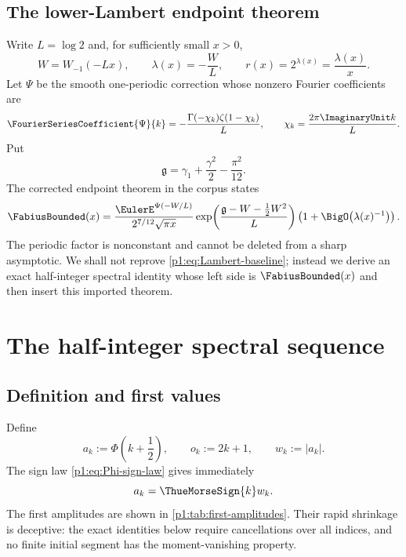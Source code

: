 \documentclass[11pt,oneside]{article}
\theoremstyle{definition}
\theoremstyle{remark}
\newcommand{\PhiU}{\Phi}
\begin{document}
\subsection{The lower-Lambert endpoint theorem}

Write $L=\log2$ and, for sufficiently small $x>0$,
\begin{equation}\label{p1:eq:lambda-W-def}
 W=W_{-1}(-Lx),
 \qquad
 \lambda(x)=-\frac WL,
 \qquad
 r(x)=2^{\lambda(x)}=\frac{\lambda(x)}x.
\end{equation}
Let $\Psi$ be the smooth one-periodic correction whose nonzero Fourier
coefficients are
\begin{equation}\label{p1:eq:Psi-coeff-baseline}
 \FourierSeriesCoefficient{\Psi}{k}=-\frac{\Gamma(-\chi_k)\zeta(1-\chi_k)}L,
 \qquad
 \chi_k=\frac{2\pi\ImaginaryUnit k}{L}.
\end{equation}
Put
\begin{equation}\label{p1:eq:g-constant}
 \mathfrak g=\gamma_1+\frac{\gamma^2}{2}-\frac{\pi^2}{12}.
\end{equation}
The corrected endpoint theorem in the corpus states
\begin{equation}\label{p1:eq:Lambert-baseline}
 \FabiusBounded(x)=
 \frac{\EulerE^{\Psi(-W/L)}}{2^{7/12}\sqrt{\pi x}}
 \exp\!\left(\frac{\mathfrak g-W-\tfrac12W^2}{L}\right)
 \left(1+\BigO\!\left(\lambda(x)^{-1}\right)\right).
\end{equation}
The periodic factor is nonconstant and cannot be deleted from a sharp
asymptotic.  We shall not reprove \eqref{p1:eq:Lambert-baseline}; instead we derive
an exact half-integer spectral identity whose left side is $\FabiusBounded(x)$ and then
insert this imported theorem.

\section{The half-integer spectral sequence}\label{p1:sec:half-spectrum}

\subsection{Definition and first values}

Define
\begin{equation}\label{p1:eq:a-k-def}
 a_k:=\PhiU\!\left(k+\frac12\right),
 \qquad
 o_k:=2k+1,
 \qquad
 w_k:=|a_k|.
\end{equation}
The sign law \eqref{p1:eq:Phi-sign-law} gives immediately
\begin{equation}\label{p1:eq:a-sign}
 a_k=\ThueMorseSign{k} w_k.
\end{equation}
The first amplitudes are shown in \cref{p1:tab:first-amplitudes}.  Their rapid
shrinkage is deceptive: the exact identities below require cancellations over
all indices, and no finite initial segment has the moment-vanishing property.
\end{document}
